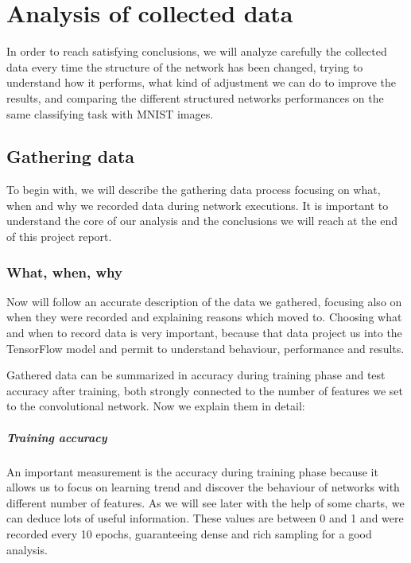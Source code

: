 \chapter{Analysis of collected data}\label{ch:data_analysis}

In order to reach satisfying conclusions, we will analyze carefully the collected data every time the structure of the network has been changed, trying to understand how it performs, what kind of adjustment we can do to improve the results, and comparing the different structured networks performances on the same classifying task with \acs{MNIST} images.

\section{Gathering data}

To begin with, we will describe the gathering data process focusing on what, when and why we recorded data during network executions. It is important to understand the core of our analysis and the conclusions we will reach at the end of this project report.

\subsection{What, when, why}

Now will follow an accurate description of the data we gathered, focusing also on when they were recorded and explaining reasons which moved to. Choosing what and when to record data is very important, because that data project us into the TensorFlow model and permit to understand behaviour, performance and results.

Gathered data can be summarized in accuracy during training phase and test accuracy after training, both strongly connected to the number of features we set to the convolutional network. Now we explain them in detail:

\paragraph{Training accuracy}

An important measurement is the accuracy during training phase because it allows us to focus on learning trend and discover the behaviour of networks with different number of features. As we will see later with the help of some charts, we can deduce lots of useful information. These values are between 0 and 1 and were recorded every 10 epochs, guaranteeing dense and rich sampling for a good analysis.

